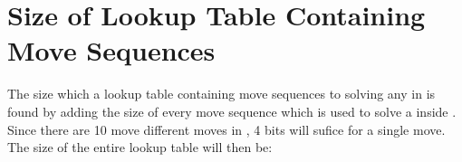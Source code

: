 \chapter{Size of Lookup Table Containing Move Sequences}
\label{chap:sizeOfLookUp}
The size which a lookup table containing move sequences to solving any \cube{} in  is found by adding the size of every move sequence which is used to solve a \cube{} inside .
Since there are 10 move different moves in , 4 bits will sufice for a single move.
The size of the entire lookup table will then be:
